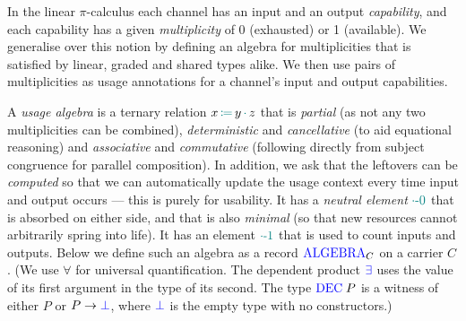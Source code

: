 \documentclass[runningheads]{llncs}
\newcommand{\picalc}{$\pi$-calculus}
\newcommand{\type}[1]{\textcolor{blue}{\operatorname{#1}}}
\newcommand{\func}[1]{\textcolor{teal}{\operatorname{#1}}}
\newcommand{\op}[3]{#1 \, \func{\coloneqq} \, #2 \, \func{\cdot} \, #3}
\newcommand{\zero}{\func{\cdot-0}}
\newcommand{\one}{\func{\cdot-1}}
\newcommand{\Algebra}{\type{ALGEBRA}}
\begin{document}
In the linear \picalc{} each channel has an input and an output \emph{capability}, and each capability has a given \emph{multiplicity} of 0 (exhausted) or 1 (available).
We generalise over this notion by defining an algebra for multiplicities that is satisfied by linear, graded and shared types alike.
We then use pairs of multiplicities as usage annotations for a channel's input and output capabilities.

\begin{nidefinition}
  A \emph{usage algebra} is a ternary relation $\op{x}{y}{z}$ that is \emph{partial} (as not any two multiplicities can be combined), \emph{deterministic} and \emph{cancellative} (to aid equational reasoning) and \emph{associative} and \emph{commutative} (following directly from subject congruence for parallel composition).
  In addition, we ask that the leftovers can be \emph{computed} so that we can automatically update the usage context every time input and output occurs --- this is purely for usability.
  It has a \emph{neutral element} $\zero$ that is absorbed on either side, and that is also \emph{minimal} (so that new resources cannot arbitrarily spring into life).
  It has an element $\one$ that is used to count inputs and outputs.
  Below we define such an algebra as a record $\Algebra_C$ on a carrier $C$.
  (We use $\forall$ for universal quantification.
  The dependent product $\type{\exists}$ uses the value of its first argument in the type of its second.
  The type $\type{DEC} \; P$ is a witness of either $P$ or $P \to \type{\bot}$, where $\type{\bot}$ is the empty type with no constructors.)


\end{nidefinition}
\end{document}
